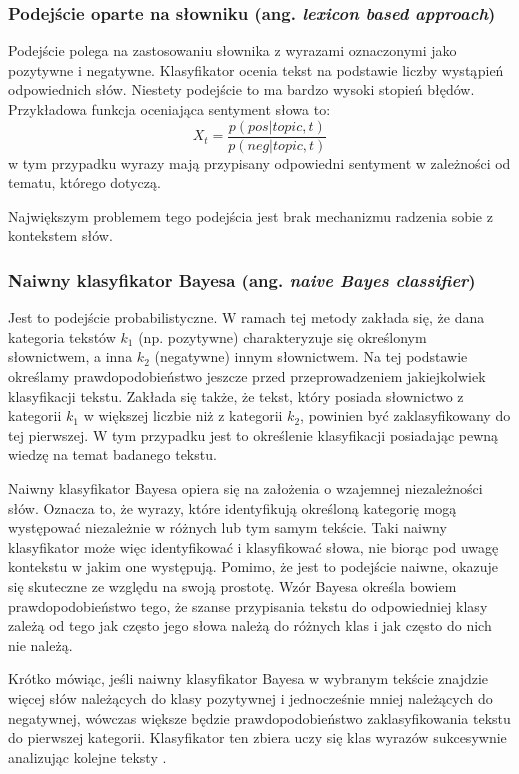 \subsubsection{Podejście oparte na słowniku (ang. \textit{lexicon based approach})}
Podejście polega na zastosowaniu słownika z wyrazami oznaczonymi jako pozytywne
i negatywne. Klasyfikator ocenia tekst na podstawie liczby wystąpień
odpowiednich słów. Niestety podejście to ma bardzo wysoki stopień błędów.
Przykładowa funkcja oceniająca sentyment słowa to:
\begin{equation}
X_t = \frac{p(pos | topic, t)}{p(neg | topic, t)}
\end{equation}
w tym przypadku wyrazy mają przypisany odpowiedni sentyment w zależności od tematu,
którego dotyczą.

Największym problemem tego podejścia jest brak mechanizmu radzenia sobie z kontekstem
słów.

\subsubsection{Naiwny klasyfikator Bayesa (ang. \textit{naive Bayes classifier})}
Jest to podejście probabilistyczne. W ramach tej metody zakłada się, że dana kategoria
tekstów $k_1$ (np. pozytywne) charakteryzuje się określonym słownictwem, 
a inna $k_2$ (negatywne) innym słownictwem. 
Na tej podstawie określamy prawdopodobieństwo jeszcze przed przeprowadzeniem
jakiejkolwiek klasyfikacji tekstu. Zakłada się także, że tekst, który posiada
słownictwo z kategorii $k_1$ w większej liczbie niż z kategorii $k_2$, powinien
być zaklasyfikowany do tej pierwszej. 
W tym przypadku jest to określenie klasyfikacji posiadając pewną wiedzę na temat
badanego tekstu.

Naiwny klasyfikator Bayesa opiera się na założenia o wzajemnej niezależności
słów. Oznacza to, że wyrazy, które identyfikują określoną kategorię mogą występować
niezależnie w różnych lub tym samym tekście. Taki naiwny klasyfikator może więc 
identyfikować i klasyfikować słowa, nie biorąc pod uwagę kontekstu w jakim one
występują. Pomimo, że jest to podejście naiwne, okazuje się skuteczne ze względu
na swoją prostotę. Wzór Bayesa określa bowiem prawdopodobieństwo tego, że szanse
przypisania tekstu do odpowiedniej klasy zależą od tego jak często jego słowa
należą do różnych klas i jak często do nich nie należą.

Krótko mówiąc, jeśli naiwny klasyfikator Bayesa w wybranym tekście znajdzie więcej
słów należących do klasy pozytywnej i jednocześnie mniej należących do negatywnej,
wówczas większe będzie prawdopodobieństwo zaklasyfikowania tekstu do pierwszej
kategorii. Klasyfikator ten zbiera uczy się klas wyrazów sukcesywnie analizując
kolejne teksty \cite{tomanekSentyment}.



